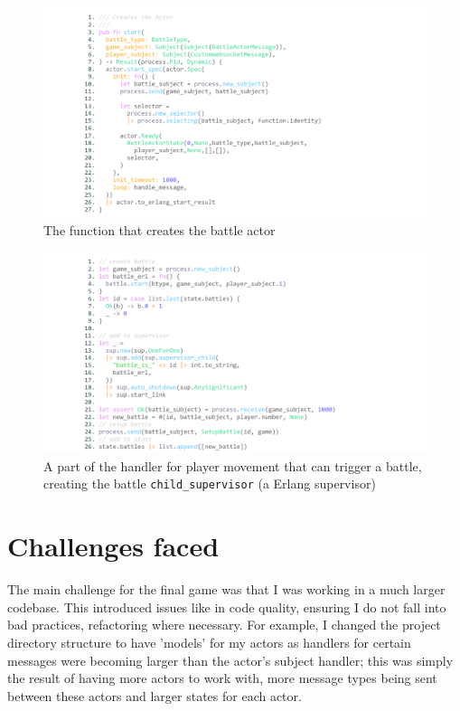 \documentclass[]{final}
\begin{document}
\begin{figure}[H]
  \centering
  \includegraphics[width=\textwidth]{battle_supervisor_start.pdf}
  \caption{The function that creates the battle actor}\label{fig: battlesupstart}
\end{figure}
\begin{figure}[H]
  \centering
  \includegraphics[width=\textwidth]{battle_supervisor.pdf}
  \caption{A part of the handler for player movement that can
    trigger a battle, creating the battle \lstinline|child_supervisor| (a Erlang supervisor)}\label{fig: battlesup}
\end{figure}

\newpage

\section{Challenges faced}

The main challenge for the final game was that I was working in a much larger
codebase. This introduced issues like in code quality, ensuring I do not fall
into bad practices, refactoring where necessary. For example, I changed the
project directory structure to have 'models' for my actors as handlers for
certain messages were becoming larger than the actor's subject handler; this
was simply the result of having more actors to work with, more message types
being sent between these actors and larger states for each actor.
\end{document}
